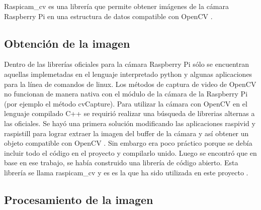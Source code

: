 Raspicam\_cv es una librería que permite obtener im\'agenes de la cámara Raspberry Pi en una estructura de datos compatible con OpenCV \cite{emilV}.

\subsection{Obtenci\'on de la imagen}\label{extraerImagen}

Dentro de las librerías oficiales para la cámara Raspberry Pi s\'olo se encuentran aquellas implemetadas en el lenguaje interpretado python y algunas aplicaciones para la línea de comandos de linux. Los métodos de captura de video de OpenCV no funcionan de manera nativa con el m\'odulo de la cámara de la Raspberry Pi (por ejemplo el método cvCapture). Para utilizar la cámara con OpenCV en el lenguaje compilado \gls{C++} se requirió realizar una búsqueda de librerias alternas a las oficiales. Se hayó una primera solución modificando las aplicaciones \gls{raspivid} y \gls{raspistill} para lograr extraer la imagen del buffer de la cámara y así obtener un objeto compatible con OpenCV \cite{pierreR}. Sin embargo era poco práctico porque se debía incluir todo el código en el proyecto y compilarlo unido. Luego se encontró que en base en ese trabajo, se había construido una librería de código abierto. Esta librería se llama raspicam\_cv y es es la que ha sido utilizada en este proyecto \cite{emilV}.


\subsection{Procesamiento de la imagen}\label{procesarImagen}


